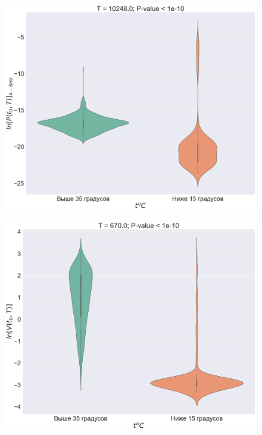 \documentclass[12pt,a4paper,oneside]{article}
\begin{document}
\begin{figure}[H]
\centering
\begin{minipage}{.5\textwidth}
  \centering
  \includegraphics[width=\textwidth]{violin_plot1.png}
  \label{fig:violin_plot1}
\end{minipage}%
\begin{minipage}{.5\textwidth}
  \centering
  \includegraphics[width=\textwidth]{violin_plot2.png}
  \label{fig:violin_plot2}
\end{minipage}
\end{figure}
\end{document}
